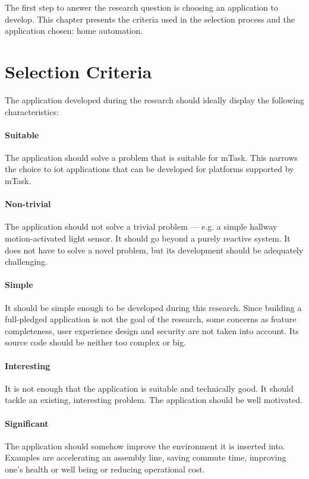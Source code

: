 The first step to answer the research question is choosing an application to develop. This chapter presents the criteria used in the selection process and the application chosen: home automation.

\section{Selection Criteria}\label{sec:selec_cri}

The application developed during the research should ideally display the following characteristics:

\paragraph{Suitable} The application should solve a problem that is suitable for mTask. This narrows the choice to \ac{iot} applications that can be developed for platforms supported by mTask.

\paragraph{Non-trivial} The application should not solve a trivial problem --- e.g. a simple hallway  motion-activated light sensor. It should go beyond a purely reactive system. It does not have to solve a novel problem, but its development should be adequately challenging.

\paragraph{Simple} It should be simple enough to be developed during this research. Since building a full-pledged application is not the goal of the research, some concerns as feature completeness, user experience design and security are not taken into account. Its source code should be neither too complex or big.

\paragraph{Interesting} It is not enough that the application is suitable and technically good. It should tackle an existing, interesting problem. The application should be well motivated.

\paragraph{Significant} The application should somehow improve the environment it is inserted into. Examples are accelerating an assembly line, saving commute  time, improving one's health or well being or reducing operational cost.


